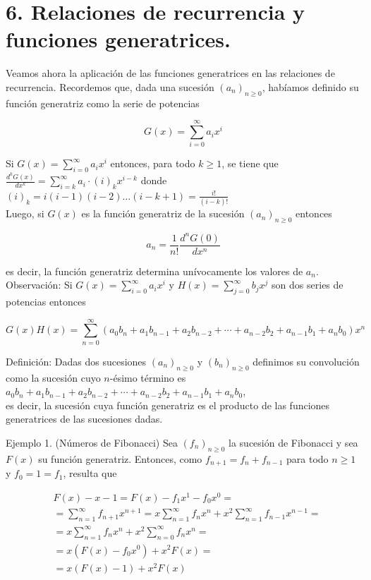 \documentclass[10pt]{article}
\begin{document}
\section*{6. Relaciones de recurrencia y funciones generatrices.}
Veamos ahora la aplicación de las funciones generatrices en las relaciones de recurrencia. Recordemos que, dada una sucesión $\left(a_{n}\right)_{n \geq 0}$, habíamos definido su función generatriz como la serie de potencias

$$
G(x)=\sum_{i=0}^{\infty} a_{i} x^{i}
$$

Si $G(x)=\sum_{i=0}^{\infty} a_{i} x^{i}$ entonces, para todo $k \geq 1$, se tiene que $\frac{d^{k} G(x)}{d x^{k}}=\sum_{i=k}^{\infty} a_{i} \cdot(i)_{k} x^{i-k}$ donde $(i)_{k}=i(i-1)(i-2) \ldots(i-k+1)=\frac{i!}{(i-k)!}$\\
Luego, si $G(x)$ es la función generatriz de la sucesión $\left(a_{n}\right)_{n \geq 0}$ entonces

$$
a_{n}=\frac{1}{n!} \frac{d^{n} G(0)}{d x^{n}}
$$

es decir, la función generatriz determina unívocamente los valores de $a_{n}$.\\
Observación: Si $G(x)=\sum_{i=0}^{\infty} a_{i} x^{i}$ y $H(x)=\sum_{j=0}^{\infty} b_{j} x^{j}$ son dos series de potencias entonces

$$
G(x) H(x)=\sum_{n=0}^{\infty}\left(a_{0} b_{n}+a_{1} b_{n-1}+a_{2} b_{n-2}+\cdots+a_{n-2} b_{2}+a_{n-1} b_{1}+a_{n} b_{0}\right) x^{n}
$$

Definición: Dadas dos sucesiones $\left(a_{n}\right)_{n \geq 0}$ y $\left(b_{n}\right)_{n \geq 0}$ definimos su convolución como la sucesión cuyo $n$-ésimo término es $a_{0} b_{n}+a_{1} b_{n-1}+a_{2} b_{n-2}+\cdots+a_{n-2} b_{2}+a_{n-1} b_{1}+a_{n} b_{0}$,\\
es decir, la sucesión cuya función generatriz es el producto de las funciones generatrices de las sucesiones dadas.

Ejemplo 1. (Números de Fibonacci) Sea $\left(f_{n}\right)_{n \geq 0}$ la sucesión de Fibonacci y sea $F(x)$ su función generatriz. Entonces, como $f_{n+1}=f_{n}+f_{n-1}$ para todo $n \geq 1$ y $f_{0}=1=f_{1}$, resulta que

$$
\begin{aligned}
& F(x)-x-1=F(x)-f_{1} x^{1}-f_{0} x^{0}= \\
& =\sum_{n=1}^{\infty} f_{n+1} x^{n+1}=x \sum_{n=1}^{\infty} f_{n} x^{n}+x^{2} \sum_{n=1}^{\infty} f_{n-1} x^{n-1}= \\
& =x \sum_{n=1}^{\infty} f_{n} x^{n}+x^{2} \sum_{n=0}^{\infty} f_{n} x^{n}= \\
& =x\left(F(x)-f_{0} x^{0}\right)+x^{2} F(x)= \\
& =x(F(x)-1)+x^{2} F(x)
\end{aligned}
$$
\end{document}
